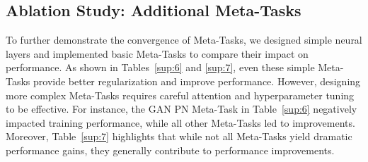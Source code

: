 \subsection{Ablation Study: Additional Meta-Tasks}
\label{sec:ablation_meta_tasks}
{\color{black} To further demonstrate the convergence of Meta-Tasks, we designed simple neural layers and implemented basic Meta-Tasks to compare their impact on performance. As shown in Tables~\ref{sup:6} and \ref{sup:7}, even these simple Meta-Tasks provide better regularization and improve performance. However, designing more complex Meta-Tasks requires careful attention and hyperparameter tuning to be effective. For instance, the GAN PN Meta-Task in Table~\ref{sup:6} negatively impacted training performance, while all other Meta-Tasks led to improvements. Moreover, Table~\ref{sup:7} highlights that while not all Meta-Tasks yield dramatic performance gains, they generally contribute to performance improvements.}

\begin{table}[htbp]
\centering
\caption{\color{black}Performance comparison of different Meta-Tasks with vanilla Prototypical Networks in a 5-Way 5-Shot 5-Query for 50,000 episodes.}
\label{sup:6}
\end{table}

